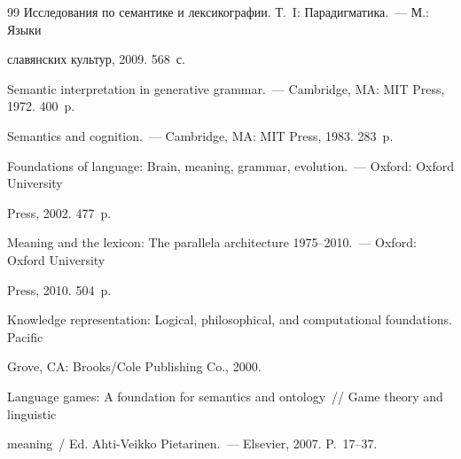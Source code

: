 {{\begin{thebibliography}{99}
Исследования по семантике и лексикографии. Т.~I: Парадигматика.~--- М.: Языки 


славянских культур, 2009.  568~с.









Semantic interpretation in generative grammar.~--- Cambridge, MA: MIT Press, 1972.  400~p.









Semantics and cognition.~--- Cambridge, MA: MIT Press, 1983. 283~p.









Foundations of language: Brain, meaning, grammar, evolution.~--- Oxford: Oxford University 


Press, 2002.  477~p.









Meaning and the lexicon: The parallela architecture 1975--2010.~--- Oxford: Oxford University 


Press, 2010. 504~p.  









Knowledge representation: Logical, philosophical, and computational foundations. Pacific 


Grove, CA: Brooks/Cole Publishing Co., 2000. 









Language games: A foundation for semantics and ontology~/\!\!/ Game theory and linguistic 


meaning~/ Ed. Ahti-Veikko Pietarinen.~--- Elsevier, 2007.  P.~17--37.






\end{thebibliography}}}
